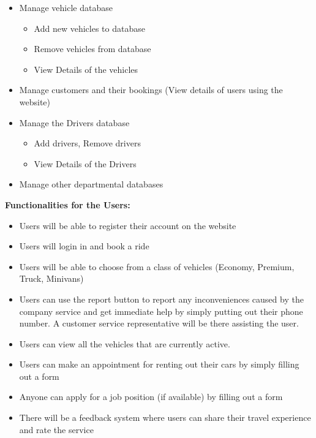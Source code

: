 \documentclass[12pt,a4paper]{article}
\begin{document}
\begin{itemize}[label=]

\item Manage vehicle database \begin{itemize} \item Add new vehicles to database \item Remove vehicles from database \item View Details of the vehicles \end{itemize}

\item Manage customers and their bookings (View details of users using the website)

\item Manage the Drivers database \begin{itemize} \item Add drivers, Remove drivers \item View Details of the Drivers \end{itemize}

\item Manage other departmental databases
\end{itemize}
\vspace{0.3cm}

\textbf{Functionalities for the Users:}
\begin{itemize}[label=]
\item Users will be able to register their account on the website
\item Users will login in and book a ride 
\item Users will be able to choose from a class of vehicles (Economy, Premium, Truck, Minivans)
\item Users can use the report button to report any inconveniences caused by the company service and get immediate help by simply putting out their phone number. A customer service representative will be there assisting the user.
\item Users can view all the vehicles that are currently active.
\item Users can make an appointment for renting out their cars by simply filling out a form
\item Anyone can apply for a job position (if available) by filling out a form
\item There will be a feedback system where users can share their travel experience and rate the service
\end{itemize}
 \,
\end{document}
